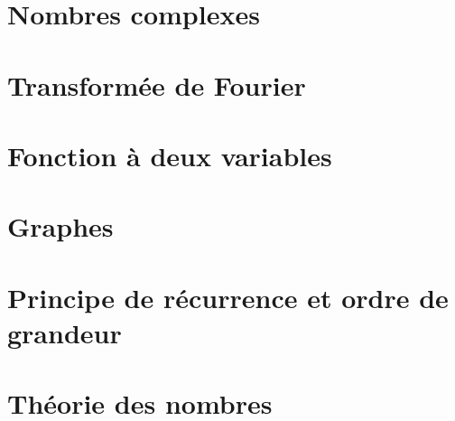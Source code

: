 \documentclass [a4paper, 11pt]{report}
\begin{document}


\part{Nombres complexes}



\part{Transformée de Fourier}





\part{Fonction à deux variables}





\part{Graphes}







\part{Principe de récurrence et ordre de grandeur}



\part{Théorie des nombres}




\end{document}
